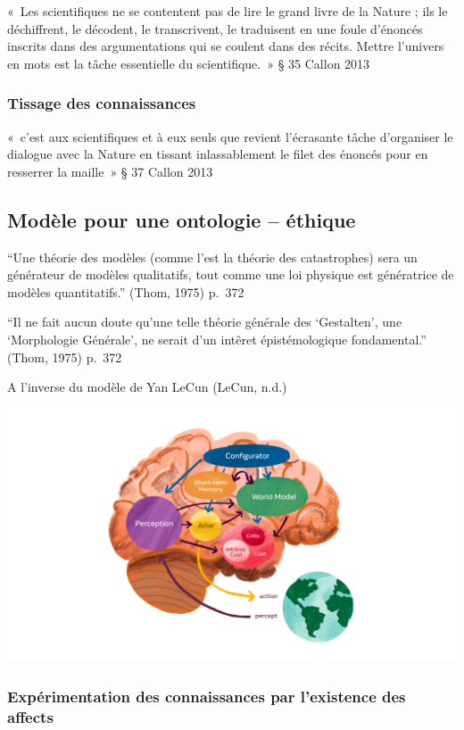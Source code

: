 \documentclass[
  a4paper,
  DIV=11,
  numbers=noendperiod]{scrreprt}
\begin{document}
«~Les scientifiques ne se contentent pas de lire le grand livre de la
Nature ; ils le déchiffrent, le décodent, le transcrivent, le traduisent
en une foule d'énoncés inscrits dans des argumentations qui se coulent
dans des récits. Mettre l'univers en mots est la tâche essentielle du
scientifique.~» § 35 Callon 2013

\subsubsection{Tissage des
connaissances}\label{tissage-des-connaissances}

«~c'est aux scientifiques et à eux seuls que revient l'écrasante tâche
d'organiser le dialogue avec la Nature en tissant inlassablement le
filet des énoncés pour en resserrer la maille~» § 37 Callon 2013

\subsection{Modèle pour une ontologie --
éthique}\label{sec-modeleOntoEthique}

``Une théorie des modèles (comme l'est la théorie des catastrophes) sera
un générateur de modèles qualitatifs, tout comme une loi physique est
génératrice de modèles quantitatifs.'' (Thom, 1975) p.~372

``Il ne fait aucun doute qu'une telle théorie générale des `Gestalten',
une `Morphologie Générale', ne serait d'un intêret épistémologique
fondamental.'' (Thom, 1975) p.~372

A l'inverse du modèle de Yan LeCun (LeCun, n.d.)

\includegraphics{images/LeCunArchitecturePerceptionAction.jpg}

\subsubsection{Expérimentation des connaissances par l'existence des
affects}\label{expuxe9rimentation-des-connaissances-par-lexistence-des-affects}
\end{document}
